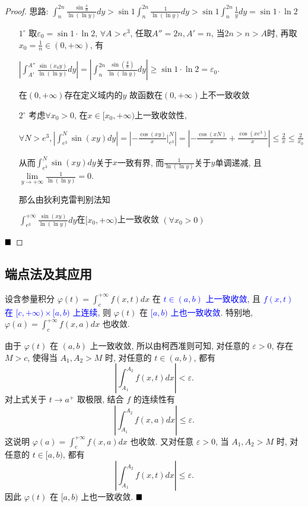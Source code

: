 \documentclass[lang=cn,newtx,10pt,scheme=chinese]{elegantbook}
\begin{document}
\begin{proof}
思路: $\int_{n}^{2n} \frac{\sin \frac{x}{n}}{\ln(\ln y)} dy > \sin 1 \int_{n}^{2n} \frac{1}{\ln(\ln y)} dy > \sin 1 \int_{n}^{2n} \frac{1}{y} dy = \sin 1 \cdot \ln 2$
\begin{enumerate}
    \item[$1^{\circ}$] 取$\varepsilon_0 = \sin 1 \cdot \ln 2$, $\forall A > e^3$, 任取$A''=2n, A'=n$, 当$2n>n>A$时, 再取$x_0 = \frac{1}{n} \in (0,+ \infty)$, 有
    
    $\left|\int_{A'}^{A''} \frac{\sin(x_0 y)}{\ln(\ln y)} dy\right| = \left|\int_{n}^{2n} \frac{\sin(\frac{y}{n})}{\ln(\ln y)} dy\right| \ge \sin 1 \cdot \ln 2 = \varepsilon_0$.
    
    在$(0, +\infty)$存在定义域内的$y$
    故函数在$(0, +\infty)$上不一致收敛
    
    \item[$2^{\circ}$] 考虑$\forall x_0 > 0$, 在$x \in [x_0, +\infty)$上一致收敛性,
    
    $\forall N > e^3, |\int_{e^3}^{N} \sin(xy) dy| = \left|-\frac{\cos(xy)}{x}|_{e^3}^{N}\right| = \left|-\frac{\cos(xN)}{x} + \frac{\cos(xe^3)}{x}\right| \le \frac{2}{x} \le \frac{2}{x_0}$
    
    从而$\int_{e^3}^{N} \sin(xy) dy$关于$x$一致有界, 而$\frac{1}{\ln(\ln y)}$关于$y$单调递减, 且$\lim\limits_{y \to +\infty} \frac{1}{\ln(\ln y)} = 0$.
    
    那么由狄利克雷判别法知
    
    $\int_{e^3}^{+\infty} \frac{\sin(xy)}{\ln(\ln y)} dy$在$[x_0, +\infty)$上一致收敛 $(\forall x_0 > 0)$
\end{enumerate}
$\hfill \blacksquare$
\end{proof}

\subsection{端点法及其应用}
\begin{proposition}[端点法]
设含参量积分 $\varphi(t) = \int_{c}^{+\infty} f(x, t) dx$ 在 \textcolor{blue}{$t \in (a, b)$ 上一致收敛}, 且 \textcolor{blue}{$f(x, t)$ 在 $[c, +\infty) \times [a, b)$ 上连续}, 则 $\varphi(t)$ 在 \textcolor{blue}{$[a, b)$ 上也一致收敛}. 特别地, $\varphi(a) = \int_{c}^{+\infty} f(x, a) dx$ 也收敛.
\end{proposition}

\begin{solution}
由于 $\varphi(t)$ 在 $(a, b)$ 上一致收敛, 所以由柯西准则可知, 对任意的 $\varepsilon > 0$, 存在 $M > c$, 使得当 $A_1, A_2 > M$ 时, 对任意的 $t \in (a, b)$, 都有
$$ \left| \int_{A_1}^{A_2} f(x, t) dx \right| < \varepsilon. $$
对上式关于 $t \to a^+$ 取极限, 结合 $f$ 的连续性有
$$ \left| \int_{A_1}^{A_2} f(x, a) dx \right| \le \varepsilon. $$
这说明 $\varphi(a) = \int_{c}^{+\infty} f(x, a) dx$ 也收敛. 又对任意 $\varepsilon > 0$, 当 $A_1, A_2 > M$ 时, 对任意的 $t \in [a, b)$, 都有
$$ \left| \int_{A_1}^{A_2} f(x, t) dx \right| \le \varepsilon. $$
因此 $\varphi(t)$ 在 $[a, b)$ 上也一致收敛.
$\hfill \blacksquare$
\end{solution}
\end{document}
